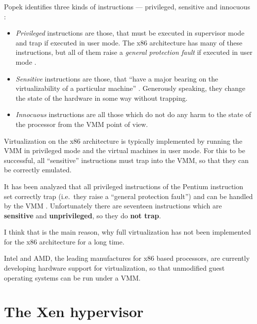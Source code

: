 Popek identifies three kinds of instructions --- privileged, sensitive and
innocuous \cite{popek74}:

\begin{itemize}
\item \emph{Privileged}  instructions are those, that must  be executed in
  supervisor mode and trap if  executed in user mode. The x86 architecture
  has many  of these instructions, but  all of them  raise a \emph{general
    protection fault} if executed in user mode \cite{robin00analysis}.
  
\item \emph{Sensitive} instructions are those, that ``have a major bearing
  on     the     virtualizability     of    a     particular     machine''
  \cite{popek74}.  Generously  speaking,  they  change the  state  of  the
  hardware in some way without trapping.
  
\item \emph{Innocuous} instructions are all those which do not do any harm
  to the state of the processor from the VMM point of view.
\end{itemize}

Virtualization on the x86 architecture is typically implemented by running
the VMM in privileged mode and the virtual machines in user mode. For this
to  be successful,  all ``sensitive''  instructions \cite{popek74,popek75}
must trap into the VMM, so that they can be correctly emulated.

It  has been  analyzed that  all  privileged instructions  of the  Pentium
instruction  set correctly  trap (i.e.~they  raise a  ``general protection
fault'')   and  can   be  handled   by  the   VMM  \cite{robin00analysis}.
Unfortunately    there    are    seventeen    instructions    which    are
\textbf{sensitive}  and  \textbf{unprivileged},  so  they  do  \textbf{not
  trap}.

I think  that is  the main  reason, why full  virtualization has  not been
implemented for the x86 architecture for a long time.

Intel  and AMD,  the leading  manufactures for  x86 based  processors, are
currently  developing   hardware  support  for   virtualization,  so  that
unmodified guest operating systems can be run under a VMM.

\section{The Xen hypervisor}
\label{sec:xen-hypervisor}

